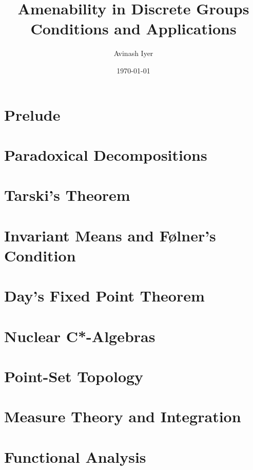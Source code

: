\documentclass[10pt]{package2}
\title{Amenability in Discrete Groups\\ {\large Conditions and Applications}}
\author{Avinash Iyer}
\date{\today}
\begin{document}
\maketitle
\tableofcontents
\RaggedRight
\chapter{Prelude}
\chapter{Paradoxical Decompositions}

\chapter{Tarski's Theorem}

\chapter{Invariant Means and Følner's Condition}
\chapter{Day's Fixed Point Theorem}
\chapter{Nuclear C*-Algebras}
\appendix
\chapter{Point-Set Topology}

\chapter{Measure Theory and Integration}

\chapter{Functional Analysis}
\nocite{*}
\printbibliography
\end{document}
